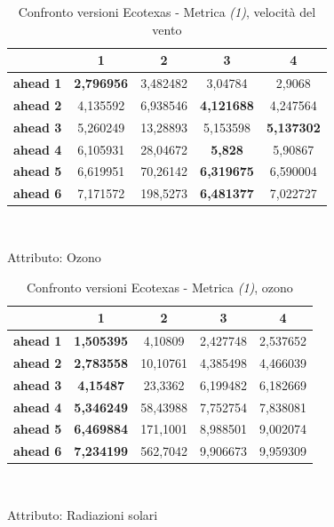 \documentclass[12pt,a4paper,oneside,openright]{book}
\begin{document}
\begin{table}[H]
\centering
\begin{tabular}{|c|c|c|c|c|}
\hline
& 1 & 2 & 3 & 4 \\
\hline
\textbf{ahead 1} & \textbf{2,796956} & 3,482482 & 3,04784 & 2,9068\\
\hline
\textbf{ahead 2} & 4,135592 & 6,938546 & \textbf{4,121688} & 4,247564\\ 
\hline
\textbf{ahead 3} & 5,260249 & 13,28893 & 5,153598 & \textbf{5,137302}\\
\hline
\textbf{ahead 4} & 6,105931 & 28,04672 & \textbf{5,828} & 5,90867 \\ 
\hline
\textbf{ahead 5} & 6,619951 & 70,26142 & \textbf{6,319675} & 6,590004 \\
\hline
\textbf{ahead 6} & 7,171572 & 198,5273 & \textbf{6,481377} & 7,022727 \\
\hline
\end{tabular} \\
\caption{Confronto versioni Ecotexas - Metrica \textit{(1)}, velocità del vento}
\end{table} 

\medskip

Attributo: Ozono \\ 

\begin{table}[H]
\centering
\begin{tabular}{|c|c|c|c|c|}
\hline
& 1 & 2 & 3 & 4 \\
\hline
\textbf{ahead 1} & \textbf{1,505395} & 4,10809 & 2,427748 & 2,537652\\
\hline
\textbf{ahead 2} & \textbf{2,783558} & 10,10761 & 4,385498 & 4,466039 \\
\hline
\textbf{ahead 3} & \textbf{4,15487} & 23,3362 & 6,199482 & 6,182669 \\
\hline
\textbf{ahead 4} & \textbf{5,346249} & 58,43988 & 7,752754 & 7,838081 \\
\hline
\textbf{ahead 5} & \textbf{6,469884} & 171,1001 & 8,988501 & 9,002074 \\
\hline
\textbf{ahead 6} & \textbf{7,234199} & 562,7042 & 9,906673 & 9,959309 \\ 
\hline
\end{tabular} \\
\caption{Confronto versioni Ecotexas - Metrica \textit{(1)}, ozono}
\end{table} 

\medskip

Attributo: Radiazioni solari \\ 
\end{document}
